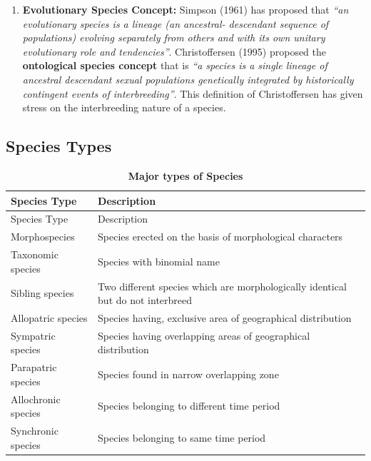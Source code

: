 \documentclass[
]{book}
\providecommand{\tightlist}{%
  \setlength{\itemsep}{0pt}\setlength{\parskip}{0pt}}
\begin{document}
\begin{enumerate}
\def\labelenumi{\arabic{enumi}.}
\setcounter{enumi}{3}
\tightlist
\item
  \textbf{Evolutionary Species Concept:} Simpson (1961) has proposed that \emph{``an evolutionary species is a lineage (an ancestral- descendant sequence of populations) evolving separately from others and with its own unitary evolutionary role and tendencies''}. Christoffersen (1995) proposed the \textbf{ontological species concept} that is \emph{``a species is a single lineage of ancestral descendant sexual populations genetically integrated by historically contingent events of interbreeding''}. This definition of Christoffersen has given stress on the interbreeding nature of a species.
\end{enumerate}

\hypertarget{species-types}{%
\subsection{Species Types}\label{species-types}}

\begin{longtable}[]{@{}
  >{\raggedright\arraybackslash}p{}
  >{\raggedright\arraybackslash}p{}@{}}
\caption{\textbf{\label{tab:species-type} Major types of Species}}\tabularnewline
\toprule
Species Type & Description \\
\midrule
\endfirsthead
\toprule
Species Type & Description \\
\midrule
\endhead
Morphospecies & Species erected on the basis of morphological characters \\
Taxonomic species & Species with binomial name \\
Sibling species & Two different species which are morphologically identical but do not interbreed \\
Allopatric species & Species having, exclusive area of geographical distribution \\
Sympatric species & Species having overlapping areas of geographical distribution \\
Parapatric species & Species found in narrow overlapping zone \\
Allochronic species & Species belonging to different time period \\
Synchronic species & Species belonging to same time period \\
\bottomrule
\end{longtable}
\end{document}
